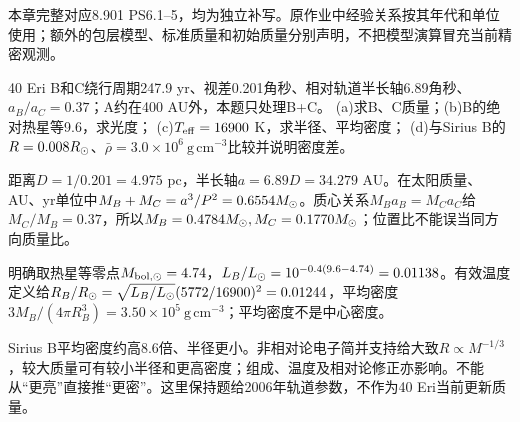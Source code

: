 本章完整对应8.901 PS6.1--5，均为独立补写。原作业中经验关系按其年代和单位使用；额外的包层模型、标准质量和初始质量分别声明，不把模型演算冒充当前精密观测。

\begin{exercise}
40 Eri B和C绕行周期247.9 yr、视差0.201角秒、相对轨道半长轴6.89角秒、$a_B/a_C=0.37$；A约在400 AU外，本题只处理B+C。
(a)求B、C质量；(b)B的绝对热星等9.6，求光度；
(c)$T_{\rm eff}=16900$ K，求半径、平均密度；
(d)与Sirius B的$R=0.008R_{\odot}$、$\bar\rho=3.0\times10^6\ \mathrm{g\,cm^{-3}}$比较并说明密度差。
\end{exercise}
\begin{solution}
距离$D=1/0.201=4.975$ pc，半长轴$a=6.89D=34.279$ AU。在太阳质量、AU、yr单位中$M_B+M_C=a^3/P^2=0.6554M_{\odot}$。质心关系$M_Ba_B=M_Ca_C$给$M_C/M_B=0.37$，所以$M_B=0.4784M_{\odot},M_C=0.1770M_{\odot}$；位置比不能误当同方向质量比。

明确取热星等零点$M_{{\rm bol},\odot}=4.74$，$L_B/L_{\odot}=10^{-0.4(9.6-4.74)}=0.01138$。有效温度定义给$R_B/R_{\odot}=\sqrt{L_B/L_{\odot}}(5772/16900)^2=0.01244$，平均密度$3M_B/(4\pi R_B^3)=3.50\times10^5\ \mathrm{g\,cm^{-3}}$；平均密度不是中心密度。

Sirius B平均密度约高8.6倍、半径更小。非相对论电子简并支持给大致$R\propto M^{-1/3}$，较大质量可有较小半径和更高密度；组成、温度及相对论修正亦影响。不能从“更亮”直接推“更密”。这里保持题给2006年轨道参数，不作为40 Eri当前更新质量。
\end{solution}

